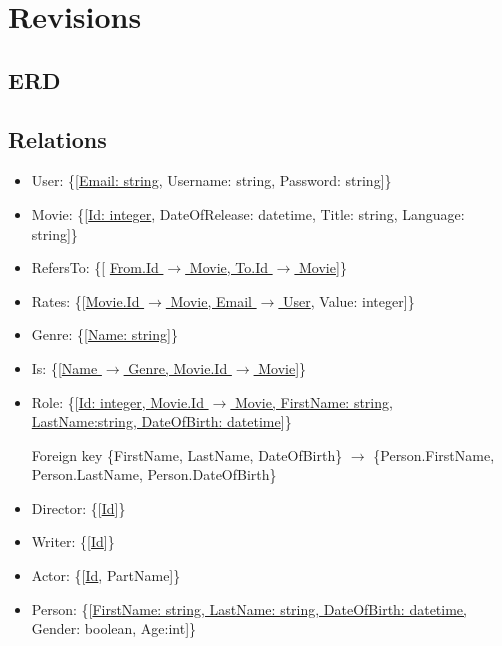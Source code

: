 \section{Revisions}

\subsection{ERD}

\subsection{Relations}
\begin{itemize}
\item User: \{[\underline{Email: string}, Username: string, Password: string]\}

\item Movie: \{[\underline{Id: integer}, DateOfRelease: datetime, Title: string, Language: string]\}

\item RefersTo: \{[ \underline{From.Id $\rightarrow$ Movie, To.Id $\rightarrow$ Movie}]\}

\item Rates: \{[\underline{Movie.Id $\rightarrow$ Movie, Email $ \rightarrow $ User}, Value: integer]\}

\item Genre: \{[\underline{Name: string}]\}

\item Is: \{[\underline{Name $\rightarrow$ Genre, Movie.Id $\rightarrow$ Movie}]\}

\item Role: \{[\underline{Id: integer, Movie.Id $\rightarrow$ Movie, FirstName: string},\\ \underline{LastName:string, DateOfBirth: datetime}]\}

Foreign key \{FirstName, LastName, DateOfBirth\} $ \rightarrow $ \{Person.FirstName, Person.LastName, Person.DateOfBirth\}

\item Director: \{[\underline{Id}]\}

\item Writer: \{[\underline{Id}]\}

\item Actor: \{[\underline{Id}, PartName]\}

\item Person: \{[\underline{FirstName: string, LastName: string, DateOfBirth: datetime,} Gender: boolean, Age:int]\}


\end{itemize}
